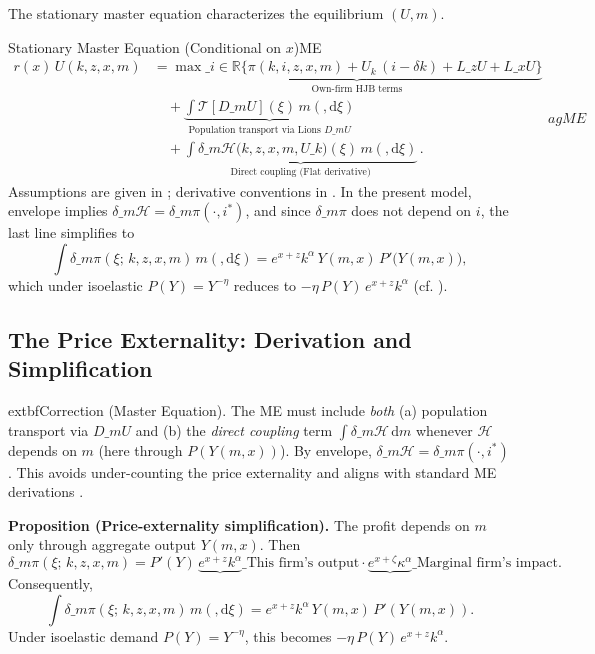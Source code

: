 ﻿\documentclass[11pt,letterpaper,oneside]{article}
\numberwithin{equation}{section}
\newcommand{\R}{\mathbb{R}}
\newcommand{\1}{\mathbf{1}}
\newcommand{\diff}{,\mathrm{d}}
\newcommand{\Lz}{L\_z}
\newcommand{\Lx}{L\_x}
\newcommand{\dmU}{D\_m U}
\newcommand{\Dm}{D\_m}
\begin{document}
The stationary master equation characterizes the equilibrium $(U,m)$.

\begin{theorem}{Stationary Master Equation (Conditional on $x$)}{ME}
\begin{equation}
\boxed{\begin{aligned}
r(x)\,U(k,z,x,m) &= \underbrace{\max\_{i\in\R}\big\{\pi(k,i,z,x,m) + U_k\,(i-\delta k) + \Lz U + \Lx U\big\}}_{\text{Own-firm HJB terms}} \\
&\quad + \underbrace{\int \mathcal{T}[\dmU](\xi)\, m(\diff \xi)}_{\text{Population transport via Lions $\Dm U$}} \\
&\quad + \underbrace{\int \delta\_m \mathcal H\big(k,z,x,m,U\_k\big)(\xi)\, m(\diff \xi)}_{\text{Direct coupling (Flat derivative)}}\,.
\end{aligned}}
  	ag{ME}\label{eq:ME}
\end{equation}
Assumptions are given in ; derivative conventions in . In the present model, envelope implies $\delta\_m \mathcal H=\delta\_m \pi(\cdot,i^*)$, and since $\delta\_m \pi$ does not depend on $i$, the last line simplifies to
\[
\int \delta\_m \pi(\xi;\,k,z,x,m)\, m(\diff \xi)
= e^{x+z}k^\alpha\, Y(m,x)\,P'\!\big(Y(m,x)\big),
\]
which under isoelastic $P(Y)=Y^{-\eta}$ reduces to $-\eta\,P(Y)\,e^{x+z}k^\alpha$ (cf. ).
\end{theorem}

\subsection{The Price Externality: Derivation and Simplification}\label{sec:me-externality}

\begin{tcolorbox}[mathstyle]
	extbf{Correction (Master Equation).} The ME must include \emph{both} (a) population transport via $\Dm U$ and (b) the \emph{direct coupling} term $\int \delta\_m \mathcal H\,\mathrm dm$ whenever $\mathcal H$ depends on $m$ (here through $P(Y(m,x))$). By envelope, $\delta\_m \mathcal H=\delta\_m \pi(\cdot,i^*)$. This avoids under-counting the price externality and aligns with standard ME derivations \cite{carmona_delarue_2018_mfg,cardaliaguet_delarue_lasry_lions_2019}.
\end{tcolorbox}

\begin{tcolorbox}[mathstyle]
\textbf{Proposition (Price-externality simplification).}\label{prop:externality}
The profit depends on $m$ only through aggregate output $Y(m,x)$. Then
\[
\delta\_m \pi(\xi;\,k,z,x,m)= P'(Y)\,\underbrace{e^{x+z}k^\alpha}\_{\text{This firm's output}}\cdot \underbrace{e^{x+\zeta}\kappa^\alpha}\_{\text{Marginal firm's impact}}.
\]
Consequently,
\[
\int \delta\_m \pi(\xi;\,k,z,x,m)\, m(\diff \xi)
= e^{x+z}k^\alpha\,Y(m,x)\,P'(Y(m,x)).
\]
Under isoelastic demand $P(Y)=Y^{-\eta}$, this becomes $-\eta\,P(Y)\,e^{x+z}k^\alpha$.
\end{tcolorbox}
\end{document}
